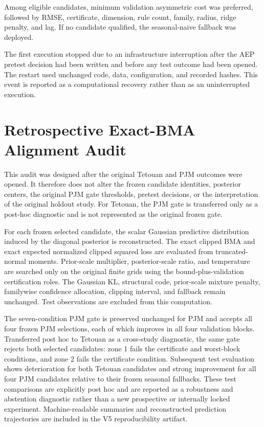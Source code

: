 \documentclass[12pt,draftclsnofoot,onecolumn]{IEEEtran}
\begin{document}
	Among eligible candidates, minimum validation asymmetric cost was preferred, followed by RMSE, certificate, dimension, rule count, family, radius, ridge penalty, and lag. If no candidate qualified, the seasonal-naive fallback was deployed.
	
	The first execution stopped due to an infrastructure interruption after the AEP pretest decision had been written and before any test outcome had been opened. The restart used unchanged code, data, configuration, and recorded hashes. This event is reported as a computational recovery rather than as an uninterrupted execution.

\section{Retrospective Exact-BMA Alignment Audit}
\label{sup:exact_bma_alignment}

This audit was designed after the original Tetouan and PJM outcomes were
opened. It therefore does not alter the frozen candidate identities,
posterior centers, the original PJM gate thresholds, pretest decisions, or
the interpretation of the original holdout study. For Tetouan, the PJM gate
is transferred only as a post-hoc diagnostic and is not represented as the
original frozen gate.

For each frozen selected candidate, the scalar Gaussian predictive
distribution induced by the diagonal posterior is reconstructed. The exact
clipped BMA and exact expected normalized clipped squared loss are evaluated
from truncated-normal moments. Prior-scale multiplier, posterior-scale ratio,
and temperature are searched only on the original finite grids using the
bound-plus-validation certification roles. The Gaussian KL, structural code,
prior-scale mixture penalty, familywise confidence allocation, clipping
interval, and fallback remain unchanged. Test observations are excluded from
this computation.

The seven-condition PJM gate is preserved unchanged for PJM and accepts all
four frozen PJM selections, each of which improves in all four validation
blocks. Transferred post hoc to Tetouan as a cross-study diagnostic, the
same gate rejects both selected candidates: zone 1 fails the certificate
and worst-block conditions, and zone 2 fails the certificate condition.
Subsequent test evaluation shows deterioration for both Tetouan candidates
and strong improvement for all four PJM candidates relative to their frozen
seasonal fallbacks. These test comparisons are explicitly post hoc and are
reported as a robustness and abstention diagnostic rather than a new prospective or internally locked
experiment. Machine-readable summaries and reconstructed
prediction trajectories are included in the V5 reproducibility artifact.
	
\end{document}
